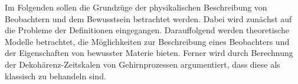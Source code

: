 \vspace*{0.75cm}
\begin{center}
	\parbox{0.8\textwidth}{Im Folgenden sollen die Grundzüge der physikalischen Beschreibung von Beobachtern und
		dem Bewusstsein betrachtet werden. Dabei wird zunächst auf die Probleme der 
		Definitionen eingegangen. Darauffolgend werden theoretische Modelle betrachtet, die
		Möglichkeiten zur Beschreibung eines Beobachters und der Eigenschaften 
		von bewusster Materie bieten. Ferner wird durch Berechnung der Dekohärenz-Zeitskalen 
		von Gehirnprozessen argumentiert, dass diese als klassisch zu behandeln sind.}
\end{center}
\vspace{0.75cm}